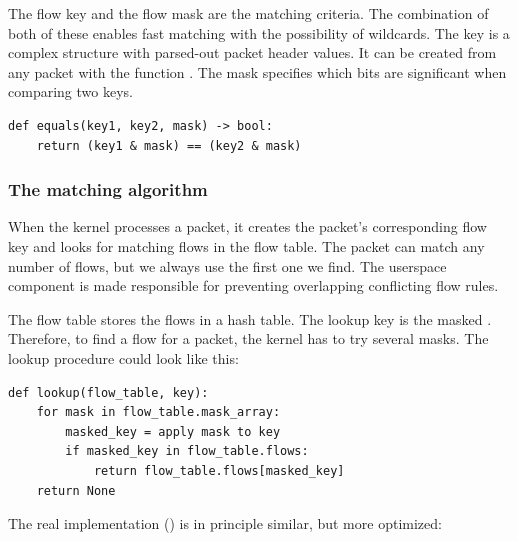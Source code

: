 The flow key and the flow mask are the matching criteria. The combination of both of these enables fast matching with the possibility of wildcards. The key is a complex structure with parsed-out packet header values. It can be created from any packet with the function \href{https://elixir.bootlin.com/linux/v6.2.6/source/net/openvswitch/flow.c\#L886}{}. The mask specifies which bits are significant when comparing two keys.

\begin{verbatim}
def equals(key1, key2, mask) -> bool:
    return (key1 & mask) == (key2 & mask)
\end{verbatim}


\subsubsection{The matching algorithm}
\label{subsec:matching-algo}

When the kernel processes a packet, it creates the packet's corresponding flow key and looks for matching flows in the flow table. The packet can match any number of flows, but we always use the first one we find. The userspace component is made responsible for preventing overlapping conflicting flow rules.

The flow table stores the flows in a hash table. The lookup key is the masked . Therefore, to find a flow for a packet, the kernel has to try several masks. The lookup procedure could look like this:

\begin{verbatim}
def lookup(flow_table, key):
    for mask in flow_table.mask_array:
        masked_key = apply mask to key
        if masked_key in flow_table.flows:
            return flow_table.flows[masked_key]
    return None
\end{verbatim}
    

The real implementation (\href{https://elixir.bootlin.com/linux/v6.2.5/source/net/openvswitch/flow_table.c\#L785}{}) is in principle similar, but more optimized:

